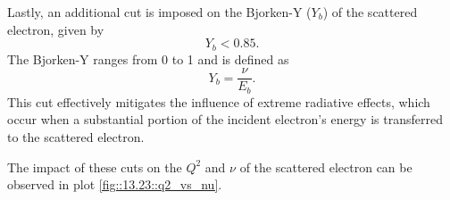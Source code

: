     Lastly, an additional cut is imposed on the Bjorken-Y ($Y_b$) of the scattered electron, given by
    \begin{equation*}
        Y_b < 0.85.
    \end{equation*}
    The Bjorken-Y ranges from 0 to 1 and is defined as
    \begin{equation*}
        Y_b = \frac{\nu}{E_b}.
    \end{equation*}
    This cut effectively mitigates the influence of extreme radiative effects, which occur when a substantial portion of the incident electron's energy is transferred to the scattered electron.

    The impact of these cuts on the $Q^2$ and $\nu$ of the scattered electron can be observed in plot \ref{fig::13.23::q2_vs_nu}.
